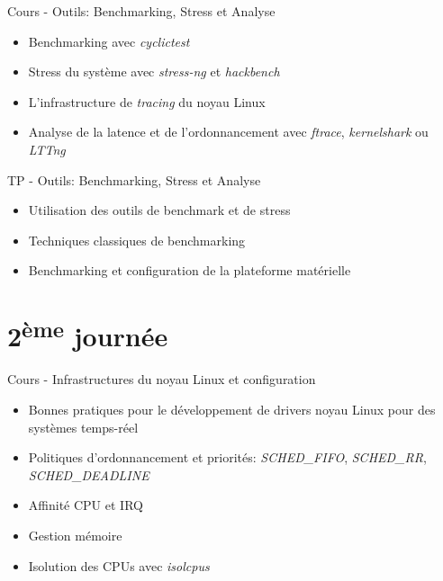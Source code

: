 \documentclass[a4paper,12pt,obeyspaces,spaces,hyphens]{article}
\begin{document}
\feagendatwocolumn
{Cours - Outils: Benchmarking, Stress et Analyse}
{
  \begin{itemize}
  \item Benchmarking avec {\em cyclictest}
  \item Stress du système avec {\em stress-ng} et {\em hackbench}
  \item L'infrastructure de {\em tracing} du noyau Linux
  \item Analyse de la latence et de l'ordonnancement avec {\em
      ftrace}, {\em kernelshark} ou {\em LTTng}
  \end{itemize}
}
{TP - Outils: Benchmarking, Stress et Analyse}
{
  \begin{itemize}
  \item Utilisation des outils de benchmark et de stress
  \item Techniques classiques de benchmarking
  \item Benchmarking et configuration de la plateforme matérielle
  \end{itemize}
}

\section{2\textsuperscript{ème} journée}

\feagendaonecolumn
{Cours - Infrastructures du noyau Linux et configuration}
{
  \begin{itemize}
  \item Bonnes pratiques pour le développement de drivers noyau Linux
    pour des systèmes temps-réel
  \item Politiques d'ordonnancement et priorités: {\em SCHED\_FIFO},
    {\em SCHED\_RR}, {\em SCHED\_DEADLINE}
  \item Affinité CPU et IRQ
  \item Gestion mémoire
  \item Isolution des CPUs avec {\em isolcpus}
  \end{itemize}
}
\end{document}
